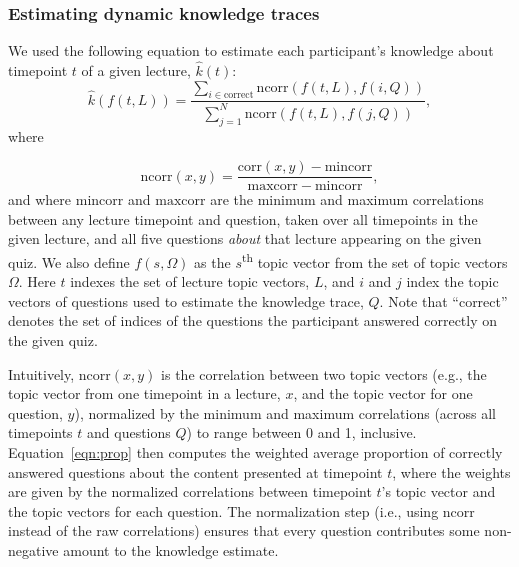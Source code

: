 \documentclass[10pt]{article}
\providecommand{\DIFaddtex}[1]{{\protect\color{blue}\uwave{#1}}} %
\providecommand{\DIFaddbegin}{} %
\providecommand{\DIFadd}[1]{\texorpdfstring{\DIFaddtex{#1}}{#1}} %
\newcommand{\DIFaddincludegraphics}[2][]{{\color{blue}\fbox{\DIFOincludegraphics[#1]{#2}}}} %
\DeclareRobustCommand{\DIFaddbegin}{\DIFOaddbegin \let\includegraphics\DIFaddincludegraphics} %
\begin{document}
\subsubsection*{Estimating dynamic knowledge traces}\label{subsec:traces}

We used the following equation to estimate each participant's knowledge about
timepoint $t$ of a given lecture, $\hat{k}(t)$:
\begin{equation}
    \hat{k}\left(f(t, L)\right) = \frac{\sum_{i \in \mathrm{correct}}\mathrm{ncorr}\left(f(t, L), f(i, Q)\right)}{\sum_{j = 1}^N \mathrm{ncorr}\left(f(t, L), f(j, Q)\right)},
    \label{eqn:prop}
\end{equation}
where

\begin{equation}
    \mathrm{ncorr}(x, y) = \frac{\mathrm{corr}(x, y) - \mathrm{mincorr}}{\mathrm{maxcorr} - \mathrm{mincorr}},
\end{equation}
and where $\mathrm{mincorr}$ and $\mathrm{maxcorr}$ are the minimum and maximum
correlations between any lecture timepoint and question, taken over all
timepoints in the given lecture, and all five questions \textit{about} that lecture appearing on the given quiz.
We also define $f(s, \Omega)$ as the
$s$\textsuperscript{th} topic vector from the set of topic vectors $\Omega$.
Here $t$ indexes the set of lecture topic vectors, $L$, and $i$ and $j$ index
the topic vectors of questions used to estimate the knowledge trace, $Q$. Note
that ``correct'' denotes the set of indices of the questions the participant
answered correctly on the given quiz.

Intuitively, $\mathrm{ncorr}(x, y)$ is the correlation between two topic
vectors (e.g., the topic vector from one timepoint in a lecture, $x$, and the
topic vector for one question, $y$), normalized by the minimum and maximum
correlations (across all timepoints $t$ and questions $Q$) to range between 0
and 1, inclusive. Equation~\ref{eqn:prop} then computes the weighted average
proportion of correctly answered questions about the content presented at
timepoint $t$, where the weights are given by the normalized correlations
between timepoint $t$'s topic vector and the topic vectors for each question.
The normalization step (i.e., using $\mathrm{ncorr}$ instead of the raw
correlations) ensures that every question contributes some non-negative amount
to the knowledge estimate.

\DIFaddbegin \subsubsection*{\DIFadd{Generalized linear mixed models}}\label{subsec:glmm}
\end{document}
